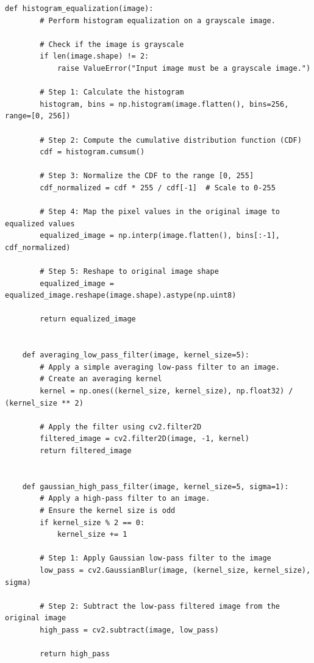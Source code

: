 \documentclass[11pt, conference, letterpaper]{IEEEtran}
\begin{document}
\begin{lstlisting}[style=python, caption={\texttt{image\_utils.py}}, label={lst:iutils}]
    def histogram_equalization(image):
        # Perform histogram equalization on a grayscale image.
    
        # Check if the image is grayscale
        if len(image.shape) != 2:
            raise ValueError("Input image must be a grayscale image.")
    
        # Step 1: Calculate the histogram
        histogram, bins = np.histogram(image.flatten(), bins=256, range=[0, 256])
    
        # Step 2: Compute the cumulative distribution function (CDF)
        cdf = histogram.cumsum()
    
        # Step 3: Normalize the CDF to the range [0, 255]
        cdf_normalized = cdf * 255 / cdf[-1]  # Scale to 0-255
    
        # Step 4: Map the pixel values in the original image to equalized values
        equalized_image = np.interp(image.flatten(), bins[:-1], cdf_normalized)
    
        # Step 5: Reshape to original image shape
        equalized_image = equalized_image.reshape(image.shape).astype(np.uint8)
    
        return equalized_image
    
    
    def averaging_low_pass_filter(image, kernel_size=5):
        # Apply a simple averaging low-pass filter to an image.
        # Create an averaging kernel
        kernel = np.ones((kernel_size, kernel_size), np.float32) / (kernel_size ** 2)
    
        # Apply the filter using cv2.filter2D
        filtered_image = cv2.filter2D(image, -1, kernel)
        return filtered_image
    
    
    def gaussian_high_pass_filter(image, kernel_size=5, sigma=1):
        # Apply a high-pass filter to an image.
        # Ensure the kernel size is odd
        if kernel_size % 2 == 0:
            kernel_size += 1
        
        # Step 1: Apply Gaussian low-pass filter to the image
        low_pass = cv2.GaussianBlur(image, (kernel_size, kernel_size), sigma)
        
        # Step 2: Subtract the low-pass filtered image from the original image
        high_pass = cv2.subtract(image, low_pass)
        
        return high_pass
\end{lstlisting}
\end{document}
